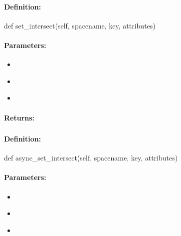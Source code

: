 \paragraph{Definition:}
\begin{pythoncode}
def set_intersect(self, spacename, key, attributes)
\end{pythoncode}

\paragraph{Parameters:}
\begin{itemize}[noitemsep]
\item {}\\

\item {}\\

\item {}\\

\end{itemize}

\paragraph{Returns:}


\pagebreak
\subsubsection{}
\label{api:python:async_set_intersect}


\paragraph{Definition:}
\begin{pythoncode}
def async_set_intersect(self, spacename, key, attributes)
\end{pythoncode}

\paragraph{Parameters:}
\begin{itemize}[noitemsep]
\item {}\\

\item {}\\

\item {}\\

\end{itemize}

